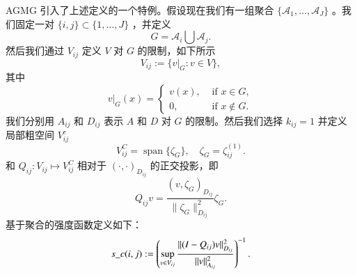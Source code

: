 \documentclass[12pt]{acta_2011xz}
\newcommand{\Span}{\ensuremath{\operatorname{span}}}
\begin{document}
AGMG 引入了上述定义的一个特例。假设现在我们有一组聚合    $ \{ \mathcal A_1, \dots, \mathcal A_J \} $    。我们固定一对    $ \{ i, j \} \subset  \{ 1, \dots, J \} $    ，并定义 
   $$G=\mathcal A_i\bigcup \mathcal A_j.$$    然后我们通过    $V_{ij}$    定义    $V$    对    $G$    的限制，如下所示 
   \begin{equation}
    V_{ij}:= \{ \left.v\right|_{G}: v\in V \} ,
\end{equation}    其中 
   \begin{equation*}
    \left. v\right|_{G}(x)= \begin{cases}
        v(x), & \text{ if } x\in G, \\ 
        0, & \text{ if } x\notin G.
    \end{cases}
\end{equation*}    我们分别用    $A_{ij}$    和    $D_{ij}$    表示    $A$    和    $D$    对    $G$    的限制。然后我们选择    $k_{ij}=1$    并定义局部粗空间    $V_{ij}^c$    
   \begin{equation*}
    V_{ij}^C= \Span \{ \zeta_G \} , \quad \zeta_G=\zeta_{ij}^{(1)}.
\end{equation*}    和    $Q_{ij}: V_{ij}\mapsto V_{ij}^C$    相对于    $(\cdot, \cdot)_{D_{ij}}$    的正交投影，即
   \begin{equation*}
    Q_{ij}v = \frac{(v, \zeta_G)_{D_{ij}}}{\|\zeta_G\|_{D_{ij}}^2}\zeta_G.
\end{equation*}    基于聚合的强度函数定义如下：
   \begin{equation}\label{sc-agg}
    s\_c(i, j):=\left(\sup_{v\in V_{ij}}\frac{\|(I-Q_{ij})v\|_{D_{ij}}^2}{\|v\|_{A_{ij}}^2}\right)^{-1}.
\end{equation}     
\end{document}
